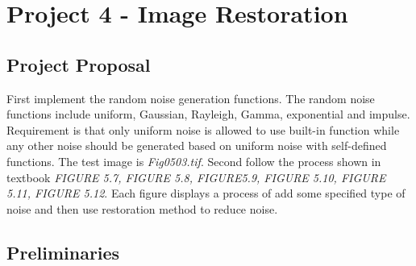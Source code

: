 \section{Project 4 - Image Restoration}
\subsection{Project Proposal}
First implement the random noise generation functions. The random noise functions include uniform, Gaussian, Rayleigh, Gamma, exponential and impulse. Requirement is that only uniform noise is allowed to use built-in function while any other noise should be generated based on uniform noise with self-defined functions. The test image is \emph{Fig0503.tif}.
Second follow the process shown in textbook \emph{FIGURE 5.7, FIGURE 5.8, FIGURE5.9, FIGURE 5.10, FIGURE 5.11, FIGURE 5.12}. Each figure displays a process of add some specified type of noise and then use restoration method to reduce noise.

\subsection{Preliminaries}
